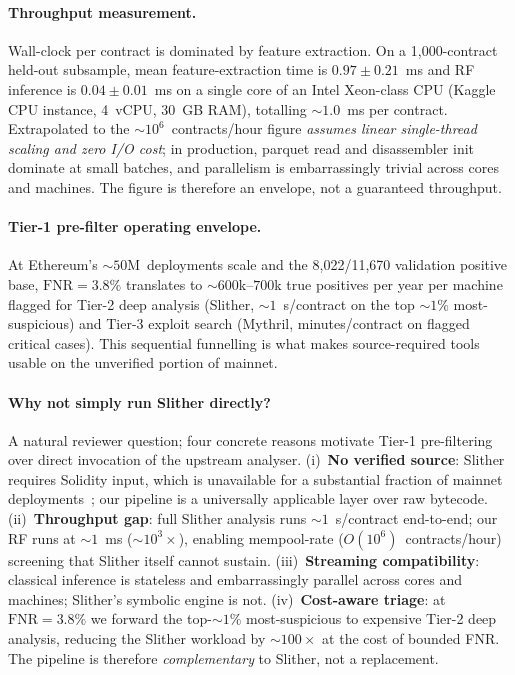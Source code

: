 \documentclass[twocolumn, 10pt]{article}
\begin{document}
\paragraph{Throughput measurement.}
Wall-clock per contract is dominated by feature extraction. On a
1{,}000-contract held-out subsample, mean feature-extraction time
is $0.97 \pm 0.21$~ms and RF inference is $0.04 \pm 0.01$~ms on a
single core of an Intel Xeon-class CPU (Kaggle CPU instance,
4~vCPU, 30~GB RAM), totalling ${\sim}1.0$~ms per contract.
Extrapolated to the ${\sim}10^{6}$~contracts/hour figure
\emph{assumes linear single-thread scaling and zero I/O cost}; in
production, parquet read and disassembler init dominate at small
batches, and parallelism is embarrassingly trivial across cores and
machines. The figure is therefore an envelope, not a guaranteed
throughput.

\paragraph{Tier-1 pre-filter operating envelope.}
At Ethereum's ${\sim}50$M~deployments scale and the 8{,}022/11{,}670
validation positive base, $\mathrm{FNR}\!=\!3.8\%$ translates to
${\sim}600$k--$700$k true positives per year per machine flagged for
Tier-2 deep analysis (Slither, ${\sim}1$~s/contract on the top
${\sim}1\%$ most-suspicious) and Tier-3 exploit search (Mythril,
minutes/contract on flagged critical cases). This sequential
funnelling is what makes source-required tools usable on the
unverified portion of mainnet.

\paragraph{Why not simply run Slither directly?}
A natural reviewer question; four concrete reasons motivate
Tier-1 pre-filtering over direct invocation of the upstream
analyser.
(i)~\textbf{No verified source}: Slither requires Solidity input,
which is unavailable for a substantial fraction of mainnet
deployments~\cite{cobra}; our pipeline is a universally applicable
layer over raw bytecode.
(ii)~\textbf{Throughput gap}: full Slither analysis runs
${\sim}1$~s/contract end-to-end; our RF runs at ${\sim}1$~ms
($\sim\!10^{3}\times$), enabling mempool-rate
($O(10^{6})$~contracts/hour) screening that Slither itself cannot
sustain.
(iii)~\textbf{Streaming compatibility}: classical inference is
stateless and embarrassingly parallel across cores and machines;
Slither's symbolic engine is not.
(iv)~\textbf{Cost-aware triage}: at $\mathrm{FNR}\!=\!3.8\%$ we
forward the top-${\sim}1\%$ most-suspicious to expensive Tier-2
deep analysis, reducing the Slither workload by ${\sim}100\times$
at the cost of bounded FNR. The pipeline is therefore
\emph{complementary} to Slither, not a replacement.
\end{document}
